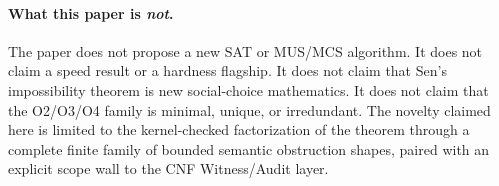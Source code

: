 \paragraph{What this paper is \emph{not}.}
The paper does not propose a new SAT or MUS/MCS algorithm.
It does not claim a speed result or a hardness flagship.
It does not claim that Sen's impossibility theorem is new social-choice mathematics.
It does not claim that the O2/O3/O4 family is minimal, unique, or irredundant.
The novelty claimed here is limited to the kernel-checked factorization of the theorem through a complete finite family of bounded semantic obstruction shapes, paired with an explicit scope wall to the CNF Witness/Audit layer.
